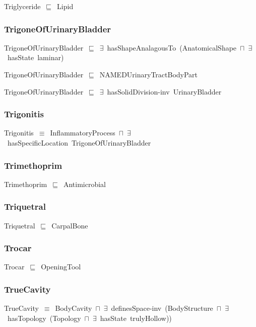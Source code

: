 \documentclass{article}
\begin{document}
Triglyceride~\ensuremath{\sqsubseteq}~Lipid~

\subsubsection*{TrigoneOfUrinaryBladder}

TrigoneOfUrinaryBladder~\ensuremath{\sqsubseteq}~\ensuremath{\exists}~hasShapeAnalagousTo~(AnatomicalShape~\ensuremath{\sqcap}~\ensuremath{\exists}~hasState~laminar)~

TrigoneOfUrinaryBladder~\ensuremath{\sqsubseteq}~NAMEDUrinaryTractBodyPart~

TrigoneOfUrinaryBladder~\ensuremath{\sqsubseteq}~\ensuremath{\exists}~hasSolidDivision-inv~UrinaryBladder~

\subsubsection*{Trigonitis}

Trigonitis~\ensuremath{\equiv}~InflammatoryProcess~\ensuremath{\sqcap}~\ensuremath{\exists}~hasSpecificLocation~TrigoneOfUrinaryBladder

\subsubsection*{Trimethoprim}

Trimethoprim~\ensuremath{\sqsubseteq}~Antimicrobial~

\subsubsection*{Triquetral}

Triquetral~\ensuremath{\sqsubseteq}~CarpalBone~

\subsubsection*{Trocar}

Trocar~\ensuremath{\sqsubseteq}~OpeningTool~

\subsubsection*{TrueCavity}

TrueCavity~\ensuremath{\equiv}~BodyCavity~\ensuremath{\sqcap}~\ensuremath{\exists}~definesSpace-inv~(BodyStructure~\ensuremath{\sqcap}~\ensuremath{\exists}~hasTopology~(Topology~\ensuremath{\sqcap}~\ensuremath{\exists}~hasState~trulyHollow))
\end{document}
